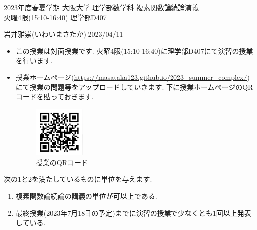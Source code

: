 \documentclass[dvipdfmx,a4paper,11pt]{article}
\theoremstyle{definition}
\begin{document}

\newpage
\begin{center}
{\Large 2023年度春夏学期 大阪大学 理学部数学科 複素関数論続論演義
} \\
 火曜4限(15:10-16:40) 理学部D407
\end{center}
\begin{flushright}
 岩井雅崇(いわいまさたか) 2023/04/11 \\
\end{flushright}

\hspace{-18pt}{\Large 基本的事項}
\begin{itemize}
  \setlength{\parskip}{0cm} %
  \setlength{\itemsep}{0cm} %
\item この授業は対面授業です. 火曜4限(15:10-16:40)に理学部D407にて演習の授業を行います.
\item 授業ホームページ(\url{https://masataka123.github.io/2023_summer_complex/})にて授業の問題等をアップロードしていきます. 
下に授業ホームページのQRコードを貼っておきます. 
\begin{figure}[htbp]
\begin{center}
 \includegraphics[height=25mm, width=25mm]{complex.png}
 \caption*{授業のQRコード}
\end{center}
\end{figure}
\end{itemize}

\hspace{-18pt}{\Large 成績に関して}

次の1と2を満たしているものに単位を与えます.
\begin{enumerate}
  \setlength{\parskip}{0cm} %
  \setlength{\itemsep}{0cm} %
\item 複素関数論続論の講義の単位が可以上である.
\item 最終授業(2023年7月18日の予定)までに演習の授業で少なくとも1回以上発表している.
\end{enumerate}
\end{document}
